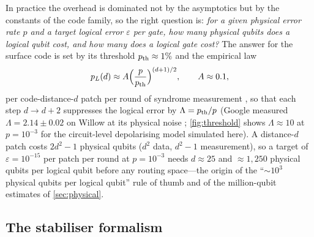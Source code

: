 In practice the overhead is dominated not by the asymptotics but by the constants of the code family, so the right question is: \emph{for a given physical error rate $p$ and a target logical error $\varepsilon$ per gate, how many physical qubits does a logical qubit cost, and how many does a logical gate cost?} The answer for the surface code is set by its threshold $p_{\rm th}\approx1\%$ and the empirical law
\begin{equation}\label{eq:plaw}
p_L(d)\approx A\Big(\frac{p}{p_{\rm th}}\Big)^{(d+1)/2},\qquad A\approx0.1,
\end{equation}
per code-distance-$d$ patch per round of syndrome measurement \cite{fowler12,fowler-gidney18}, so that each step $d\to d+2$ suppresses the logical error by $\Lambda=p_{\rm th}/p$ (Google measured $\Lambda=2.14\pm0.02$ on Willow at its physical noise \cite{willow25}; \cref{fig:threshold} shows $\Lambda\approx10$ at $p=10^{-3}$ for the circuit-level depolarising model simulated here). A distance-$d$ patch costs $2d^2-1$ physical qubits ($d^2$ data, $d^2-1$ measurement), so a target of $\varepsilon=10^{-15}$ per patch per round at $p=10^{-3}$ needs $d\approx25$ and $\approx1{,}250$ physical qubits per logical qubit before any routing space---the origin of the ``$\sim10^3$ physical qubits per logical qubit'' rule of thumb and of the million-qubit estimates of \cref{sec:physical}.

\subsection{The stabiliser formalism}\label{sec:stabiliser}

